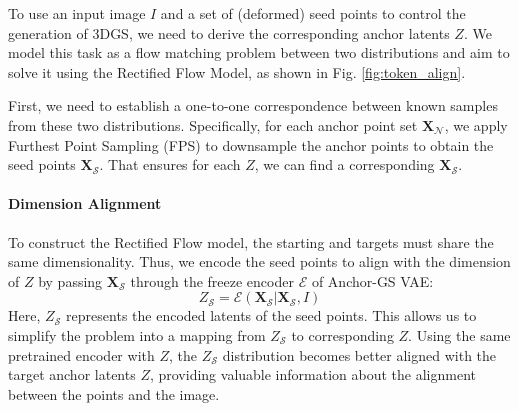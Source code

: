 To use an input image $I$ and a set of (deformed) seed points to control the generation of 3DGS, we need to derive the corresponding anchor latents \( Z \).
We model this task as a flow matching problem between two distributions and aim to solve it using the Rectified Flow Model,  as shown in Fig. \ref{fig:token_align}.

First, we need to establish a one-to-one correspondence between known samples from these two distributions.  Specifically, for each anchor point set \( \mathbf{X}_\mathcal{N} \), we apply Furthest Point Sampling (FPS) to downsample the anchor points to obtain the seed points \( \mathbf{X}_\mathcal{S} \). That ensures for each \( Z \), we can find a corresponding \( \mathbf{X}_\mathcal{S} \).

\paragraph{Dimension Alignment}
To construct the Rectified Flow model, the starting and targets must share the same dimensionality. Thus, we encode the seed points to align with the dimension of \( Z \) by passing \( \mathbf{X}_\mathcal{S} \) through the freeze encoder \( \mathcal{E} \) of Anchor-GS VAE:
\begin{equation}
  Z_\mathcal{S} = \mathcal{E}(\mathbf{X}_\mathcal{S}| \mathbf{X}_\mathcal{S}, I)  
  \label{eq:encode_seed_latents}
\end{equation}
Here, \( Z_\mathcal{S} \) represents the encoded latents of the seed points. This allows us to simplify the problem into a mapping from \( Z_\mathcal{S} \) to corresponding \( Z\). Using the same pretrained encoder with \( Z \), the \( Z_\mathcal{S} \) distribution becomes better aligned with the target anchor latents \( Z \), providing valuable information about the alignment between the points and the image.

